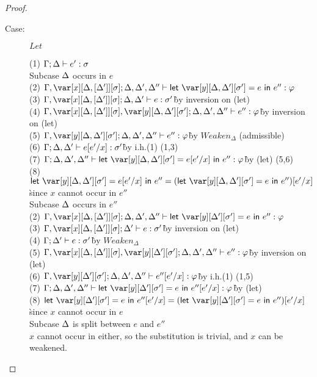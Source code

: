 \begin{proof}
\begin{description}
\item[Case:] $Let$
\begin{tabbing}
    (1) $\Gamma; \Delta \vdash e' : \sigma$\\
    Subcase $\Delta$ occurs in $e$\\
    (2) $\G, \xD; \D, \D', \D'' \vdash \llet{\y[\D,\D'][\s'] = e}{e''} : \vp$\\
    (3) $\G, \xD; \D, \D' \vdash e : \s'$\` by inversion on (let)\\
    (4) $\G, \xD,\y[\D,\D'][\s']; \D,\D', \D'' \vdash e'' : \vp$\` by inversion on (let)\\
    (5) $\G,\y[\D,\D'][\s']; \D,\D', \D'' \vdash e'' : \vp$\` by $Weaken_\Delta$ (admissible)\\
    (6) $\Gamma; \Delta,\Delta' \vdash e[e'/x] : \sigma'$\` by i.h.(1)  (1,3)\\
    (7) $\G; \D,\D',\D'' \vdash \llet{\y[\D,\D'][\s'] = e[e'/x]}{e''} : \vp$\` by (let) (5,6)\\
    (8) $\llet{\y[\D,\D'][\s'] = e[e'/x]}{e''} = (\llet{\y[\D,\D'][\s'] = e}{e''})[e'/x]$\\\` since $x$ cannot occur in $e''$\\
    Subcase $\Delta$ occurs in $e''$\\
    (2) $\G, \xD; \D, \D', \D'' \vdash \llet{\y[\D'][\s'] = e}{e''} : \vp$\\
    (3) $\G, \xD; \D' \vdash e : \s'$\` by inversion on (let)\\
    (4) $\Gamma; \Delta' \vdash e : \sigma'$\` by $Weaken_\Delta$\\
    (5) $\G,\xD,\y[\D'][\s']; \D,\D',\D'' \vdash e'' : \vp$\` by inversion on (let)\\
    (6) $\G,\y[\D'][\s']; \D,\D',\D'' \vdash e''[e'/x] : \vp$\` by i.h.(1) (1,5)\\
    (7) $\G;\D,\D',\D'' \vdash \llet{\y[\D'][\s'] = e}{e''[e'/x]} : \vp$\` by (let)\\
    (8) $\llet{\y[\D'][\s'] = e}{e''[e'/x]} = (\llet{\y[\D'][\s'] = e}{e''})[e'/x]$\\\` since $x$ cannot occur in $e$\\
    Subcase $\Delta$ is split between $e$ and $e''$\\
    $x$ cannot occur in either, so the substitution is trivial, and $x$ can be weakened.
\end{tabbing}


\end{description}
\end{proof}
